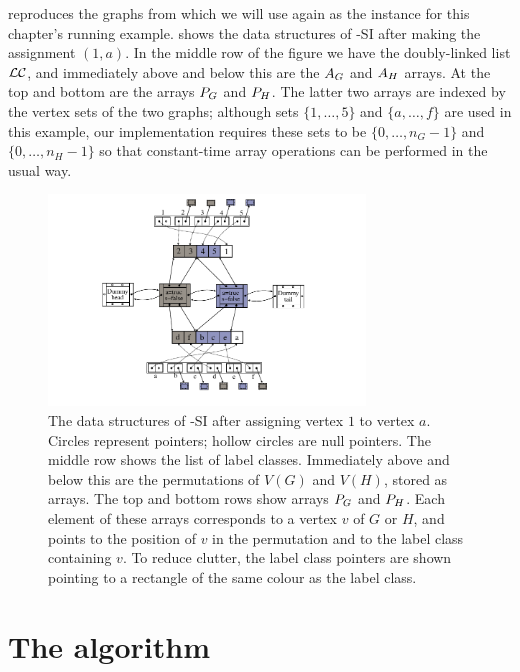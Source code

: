  reproduces the graphs from
 which we will use again as the instance for this
chapter's running example.   shows the data
structures of \McSplit-SI after making the assignment $(1,a)$.  In the middle
row of the figure we have the doubly-linked list $\mathcal{LC}$, and immediately
above and below this are the $A_G$ and $A_H$ arrays.  At the top and
bottom are the arrays $P_G$ and $P_H$.  The latter two arrays are indexed
by the vertex sets of the two graphs; although sets $\{1,\dots,5\}$ and
$\{a,\dots,f\}$ are used in this example, our implementation requires these sets to be
$\{0, \dots, n_G-1\}$ and $\{0, \dots, n_H-1\}$ so that constant-time array
operations can be performed in the usual way.


\begin{figure}[htb]
    \centering
    \includegraphics*[width=0.75\textwidth]{14b-mcsplit-induced-si/figs/data-structure-step-1}
    \caption{The data structures of \McSplit-SI after assigning vertex $1$ to vertex $a$.
        Circles represent pointers; hollow circles are null pointers.  The middle row shows
        the list of label classes.  Immediately above and below this are the
        permutations of $V(G)$ and $V(H)$, stored as arrays.  The top and bottom rows
        show arrays $P_G$ and $P_H$.  Each element of these arrays
        corresponds to a vertex $v$ of $G$ or $H$, and points to the position of $v$ in
        the permutation and to the label class containing $v$.  To reduce clutter,
        the label class pointers are shown pointing to a rectangle of the same colour as the
        label class.}
    \label{figure:si-data-structures}
\end{figure}

\FloatBarrier

\section{The algorithm}\label{sec:mcsplit-si-algorithm}

